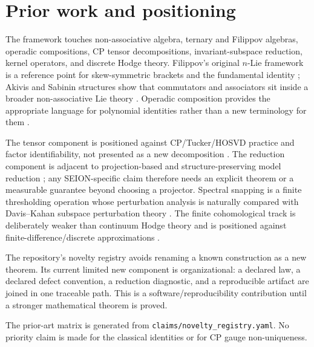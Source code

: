 \section{Prior work and positioning}

The framework touches non-associative algebra, ternary and Filippov algebras, operadic compositions, CP tensor decompositions, invariant-subspace reduction, kernel operators, and discrete Hodge theory. Filippov's original $n$-Lie framework is a reference point for skew-symmetric brackets and the fundamental identity \cite{Filippov1985}; Akivis and Sabinin structures show that commutators and associators sit inside a broader non-associative Lie theory \cite{Sabinin1999,MostovoyPerezIzquierdoShestakov2014}. Operadic composition provides the appropriate language for polynomial identities rather than a new terminology for them \cite{LodayVallette2012}.

The tensor component is positioned against CP/Tucker/HOSVD practice and factor identifiability, not presented as a new decomposition \cite{KoldaBader2009,BaderKolda2007,Kruskal1977}. The reduction component is adjacent to projection-based and structure-preserving model reduction \cite{BennerGugercinWillcox2015,ChaturantabutBeattieGugercin2016}; any SEION-specific claim therefore needs an explicit theorem or a measurable guarantee beyond choosing a projector. Spectral snapping is a finite thresholding operation whose perturbation analysis is naturally compared with Davis--Kahan subspace perturbation theory \cite{DavisKahan1970}. The finite cohomological track is deliberately weaker than continuum Hodge theory and is positioned against finite-difference/discrete approximations \cite{Dodziuk1976}.

The repository's novelty registry avoids renaming a known construction as a new theorem. Its current limited new component is organizational: a declared law, a declared defect convention, a reduction diagnostic, and a reproducible artifact are joined in one traceable path. This is a software/reproducibility contribution until a stronger mathematical theorem is proved.

The prior-art matrix is generated from \texttt{claims/novelty\_registry.yaml}. No priority claim is made for the classical identities or for CP gauge non-uniqueness.
